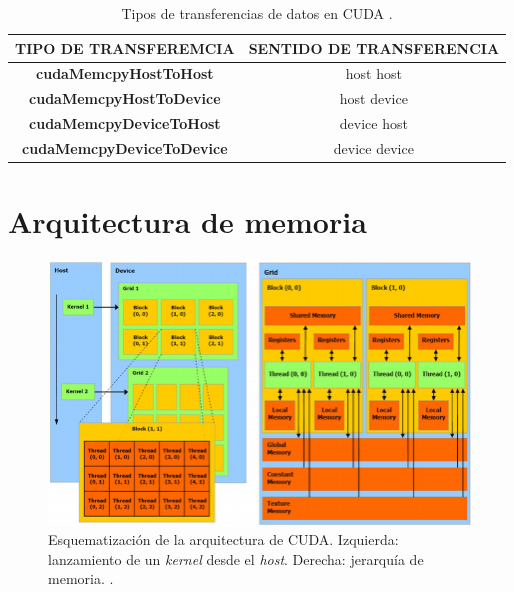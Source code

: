 \begin{table}[h!]
	\centering
	\begin{tabular}{|c|c|}
		\hline
		\multicolumn{1}{|l|}{TIPO DE TRANSFEREMCIA} & \multicolumn{1}{l|}{SENTIDO DE TRANSFERENCIA} \\ \hline
		\textbf{cudaMemcpyHostToHost}               & host host                                     \\ \hline
		\textbf{cudaMemcpyHostToDevice}             & host device                                   \\ \hline
		\textbf{cudaMemcpyDeviceToHost}             & device host                                   \\ \hline
		\textbf{cudaMemcpyDeviceToDevice}           & device device                                 \\ \hline
	\end{tabular}
	\caption{Tipos de transferencias de datos en CUDA \cite{represa2016introduccion}.}
	\label{tab:cudamemcy}
\end{table}


\section{Arquitectura de memoria}

\begin{figure}[h!]
	\centering
	\includegraphics[width=\textwidth]{figs/cap3/Schematization-of-CUDA-architecture-Schematic-representation-of-CUDA-threads-and-memory.png}
	\caption{Esquematización de la arquitectura de CUDA. Izquierda: lanzamiento de un \textit{kernel} desde el \textit{host}. Derecha: jerarquía de memoria.  \cite{nobile2014cutauleaping}.}
	\label{fig:schedule_architecture_cuda}
\end{figure}

